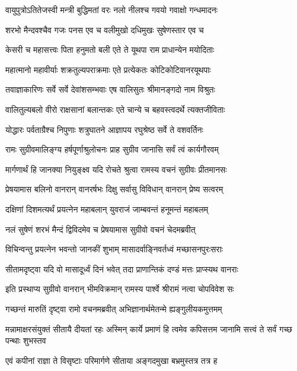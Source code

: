 \twolineshloka
{वायुपुत्रोऽतितेजस्वी मन्त्री बुद्धिमतां वरः}
{नलो नीलश्च गवयो गवाक्षो गन्धमादनः} %

\twolineshloka
{शरभो मैन्दवश्चैव गजः पनस एव च}
{वलीमुखो दधिमुखः सुषेणस्तार एव च} %

\twolineshloka
{केसरी च महासत्त्वः पिता हनुमतो बली}
{एते ते यूथपा राम प्राधान्येन मयोदिताः} %

\twolineshloka
{महात्मानो महावीर्याः शक्रतुल्यपराक्रमाः}
{एते प्रत्येकतः कोटिकोटिवानरयूथपाः} %

\twolineshloka
{तवाज्ञाकारिणः सर्वे सर्वे देवांशसम्भवाः}
{एष वालिसुतः श्रीमानङ्गदो नाम विश्रुतः} %

\twolineshloka
{वालितुल्यबलो वीरो राक्षसानां बलान्तकः}
{एते चान्ये च बहवस्त्वदर्थे त्यक्तजीविताः} %

\twolineshloka
{योद्धारः पर्वताग्रैश्च निपुणाः शत्रुघातने}
{आज्ञापय रघुश्रेष्ठ सर्वे ते वशवर्तिनः} %

\twolineshloka
{रामः सुग्रीवमालिङ्ग्य हर्षपूर्णाश्रुलोचनः}
{प्राह सुग्रीव जानासि सर्वं त्वं कार्यगौरवम्} %

\twolineshloka
{मार्गणार्थं हि जानक्या नियुङ्क्ष्व यदि रोचते}
{श्रुत्वा रामस्य वचनं सुग्रीवः प्रीतमानसः} %

\twolineshloka
{प्रेषयामास बलिनो वानरान् वानरर्षभः}
{दिक्षु सर्वासु विविधान् वानरान् प्रेष्य सत्वरम्} %

\twolineshloka
{दक्षिणां दिशमत्यर्थं प्रयत्नेन महाबलान्}
{युवराजं जाम्बवन्तं हनूमन्तं महाबलम्} %

\twolineshloka
{नलं सुषेणं शरभं मैन्दं द्विविदमेव च}
{प्रेषयामास सुग्रीवो वचनं चेदमब्रवीत्} %

\twolineshloka
{विचिन्वन्तु प्रयत्नेन भवन्तो जानकीं शुभाम्}
{मासादर्वाङ्निवर्तध्वं मच्छासनपुरःसराः} %

\twolineshloka
{सीतामदृष्ट्वा यदि वो मासादूर्ध्वं दिनं भवेत्}
{तदा प्राणान्तिकं दण्डं मत्तः प्राप्स्यथ वानराः} %

\twolineshloka
{इति प्रस्थाप्य सुग्रीवो वानरान् भीमविक्रमान्}
{रामस्य पार्श्वे श्रीरामं नत्वा चोपविवेश सः} %

\twolineshloka
{गच्छन्तं मारुतिं दृष्ट्वा रामो वचनमब्रवीत्}
{अभिज्ञानार्थमेतन्मे ह्यङ्गुलीयकमुत्तमम्} %

\threelineshloka
{मन्नामाक्षरसंयुक्तं सीतायै दीयतां रहः}
{अस्मिन् कार्ये प्रमाणं हि त्वमेव कपिसत्तम}
{जानामि सत्त्वं ते सर्वं गच्छ पन्थाः शुभस्तव} %

\twolineshloka
{एवं कपीनां राज्ञा ते विसृष्टाः परिमार्गणे}
{सीताया अङ्गदमुखा बभ्रमुस्तत्र तत्र ह} %

